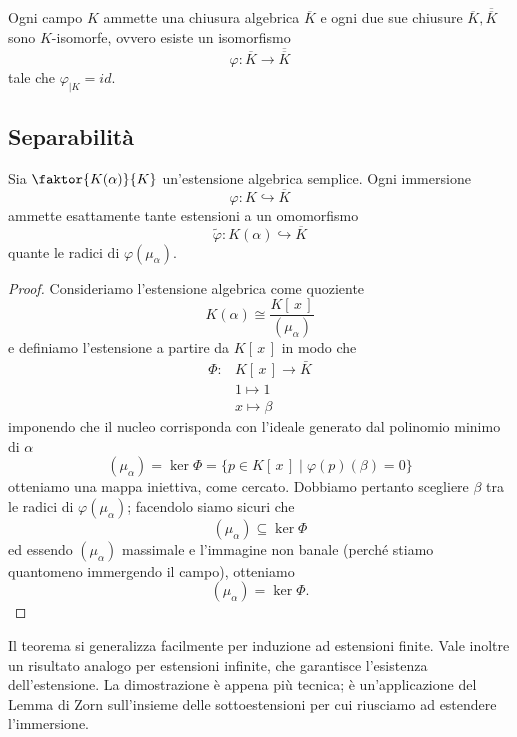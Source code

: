 \begin{multicols}{2}
\begin{theorem}
	Ogni campo $ K $ ammette una chiusura algebrica $ \overline{K} $ e ogni due sue chiusure $ \overline{K}, \overline{\overline{K}} $ sono $ K $-isomorfe, ovvero esiste un isomorfismo
	\[ \varphi : \overline{K} \to \overline{\overline{K}} \]
	tale che $ \varphi_{|K} = id $.
\end{theorem}


\end{multicols}


\subsection{Separabilità}
\begin{multicols}{2}
	
	\begin{theorem}[di immersione]\label{est}
		Sia $ \faktor{K(\alpha)}{K} $ un'estensione algebrica semplice. Ogni immersione
		\[ \varphi: K \hookrightarrow \overline{K} \]
		ammette esattamente tante estensioni a un omomorfismo
		\[ \tilde{\varphi}: K(\alpha) \hookrightarrow \overline{K} \]
		 quante le radici di $ \varphi(\mu_\alpha) $.
	\end{theorem}
	\begin{proof}
		Consideriamo l'estensione algebrica come quoziente
		\[ K(\alpha) \cong \frac{K[\, x \,]}{(\mu_\alpha)} \]
		e definiamo l'estensione a partire da $ K[\, x \,] $ in modo che
		\begin{align*}
		\Phi\colon &K[\, x \,] \to \bar{K} \\
		& 1 \mapsto 1 \\
		& x \mapsto \beta 
		\end{align*}
		imponendo che il nucleo corrisponda con l'ideale generato dal polinomio minimo di $ \alpha $
		\[ (\mu_\alpha) = \ker{\Phi} = \{ p \in K[\, x \,] \mid \varphi(p)(\beta) = 0 \} \]
		otteniamo una mappa iniettiva, come cercato.
		Dobbiamo pertanto scegliere $ \beta $ tra le radici di $ \varphi(\mu_\alpha) $; facendolo siamo sicuri che
		\[ (\mu_\alpha) \subseteq \ker{\Phi} \]
		ed essendo $ (\mu_\alpha) $ massimale e l'immagine non banale (perché stiamo quantomeno immergendo il campo), otteniamo
		\[ (\mu_\alpha) = \ker{\Phi} .\]
	\end{proof}
	\begin{remark}
		Il teorema si generalizza facilmente per induzione ad estensioni finite. Vale inoltre un risultato analogo per estensioni infinite, che garantisce l'esistenza dell'estensione. La dimostrazione è appena più tecnica; è un'applicazione del Lemma di Zorn sull'insieme delle sottoestensioni per cui riusciamo ad estendere l'immersione. 
	\end{remark}



\end{multicols}
